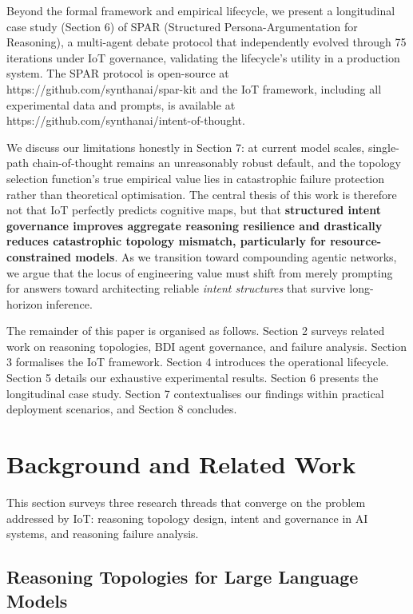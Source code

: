 \documentclass[11pt,a4paper]{article}
\begin{document}
Beyond the formal framework and empirical lifecycle, we present a
longitudinal case study (Section 6) of SPAR (Structured
Persona-Argumentation for Reasoning), a multi-agent debate protocol that
independently evolved through 75 iterations under IoT governance,
validating the lifecycle's utility in a production system. The SPAR
protocol is open-source at https://github.com/synthanai/spar-kit and the
IoT framework, including all experimental data and prompts, is available
at https://github.com/synthanai/intent-of-thought.

We discuss our limitations honestly in Section 7: at current model
scales, single-path chain-of-thought remains an unreasonably robust
default, and the topology selection function's true empirical value lies
in catastrophic failure protection rather than theoretical optimisation.
The central thesis of this work is therefore not that IoT perfectly
predicts cognitive maps, but that \textbf{structured intent governance
improves aggregate reasoning resilience and drastically reduces
catastrophic topology mismatch, particularly for resource-constrained
models}. As we transition toward compounding agentic networks, we argue
that the locus of engineering value must shift from merely prompting for
answers toward architecting reliable \emph{intent structures} that
survive long-horizon inference.

The remainder of this paper is organised as follows. Section 2 surveys
related work on reasoning topologies, BDI agent governance, and failure
analysis. Section 3 formalises the IoT framework. Section 4 introduces
the operational lifecycle. Section 5 details our exhaustive experimental
results. Section 6 presents the longitudinal case study. Section 7
contextualises our findings within practical deployment scenarios, and
Section 8 concludes.

\section{Background and Related Work}\label{background-and-related-work}

This section surveys three research threads that converge on the problem
addressed by IoT: reasoning topology design, intent and governance in AI
systems, and reasoning failure analysis.

\subsection{Reasoning Topologies for Large Language
Models}\label{reasoning-topologies-for-large-language-models}
\end{document}
